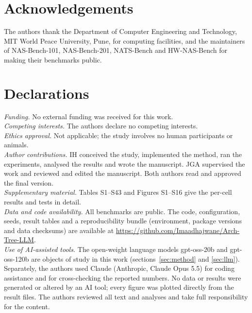 \documentclass{sadhana}
\begin{document}
\section*{Acknowledgements}
The authors thank the Department of Computer Engineering and Technology, MIT World Peace University, Pune, for computing facilities, and the maintainers of NAS-Bench-101, NAS-Bench-201, NATS-Bench and HW-NAS-Bench for making their benchmarks public.

\section*{Declarations}
\textit{Funding.} No external funding was received for this work.\\
\textit{Competing interests.} The authors declare no competing interests.\\
\textit{Ethics approval.} Not applicable; the study involves no human participants or animals.\\
\textit{Author contributions.} IH conceived the study, implemented the method, ran the experiments, analysed the results and wrote the manuscript. JGA supervised the work and reviewed and edited the manuscript. Both authors read and approved the final version.\\
\textit{Supplementary material.} Tables S1--S43 and Figures S1--S16 give the per-cell results and tests in detail.\\
\textit{Data and code availability.} All benchmarks are public. The code, configuration, seeds, result tables and a reproducibility bundle (environment, package versions and data checksums) are available at \url{https://github.com/Imaadhajwane/Arch-Tree-LLM}.\\
\textit{Use of AI-assisted tools.} The open-weight language models gpt-oss-20b and gpt-oss-120b \cite{openai2025gptoss} are objects of study in this work (sections~\ref{sec:method} and \ref{sec:llm}). Separately, the authors used Claude (Anthropic, Claude Opus 5.5) for coding assistance and for cross-checking the reported numbers. No data or results were generated or altered by an AI tool; every figure was plotted directly from the result files. The authors reviewed all text and analyses and take full responsibility for the content.

\end{document}
